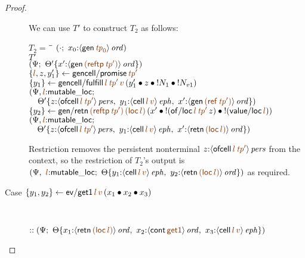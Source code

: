 \begin{proof}
\begin{description}
We can use $T'$ to construct $T_2$ as follows:
\begin{tabbing}
$T_2 = ~$ \= \qquad \= 
    $(\cdot; ~x_0{:}\istrue{\susp{{\sf gen}\,\lf{{\it tp}_0}}})$
\\
\>$T'$
\\
\>\>$(\Psi; ~
     \tackon{\Theta'}
     {x'{:}\istrue{\susp{{\sf gen}\,\lf{({\sf reftp}\,{\it tp}')}}}})$
\\
\>$\trstep{\lf{l}, z, y_1'}{{\sf gencell/promise}\,\lf{{\it tp}'}}$
\\
\>$\trstep{y_1}{{\sf gencell/fulfill}\,\lf{l}\,\lf{{\it tp}'}\,\lf{v}\,
      (\tfuser{y_1'}{\tfuser{z}{\tfuser{\tbangr{N_1}}{\tbangr{N_{v1}}}}})}$
\\
\>\>$(\Psi, \lf{l}{:}{\sf mutable\_loc};$
\\
\>\>$\quad 
     \tackon{\Theta'}
     {z{:}\ispers{\susp{{\sf ofcell}\,\lf{l}\,\lf{{\it tp}'}}}, ~
      y_1{:}\iseph{\susp{{\sf cell}\,\lf{l}\,\lf{v}}}, ~
      x'{:}\istrue{\susp{{\sf gen}\,\lf{({\sf ref}\,{\it tp}')}}}})$
\\
\>$\trstep{y_2}
     {{\sf gen/retn}\,\lf{({\sf reftp}\,{\it tp}')}\,\lf{({\sf loc}\,l)}\,(\tfuser{x'}{\tfuser{\tbangr{({\sf of/loc}\,\lf{l}\,\lf{{\it tp}'}\,z)}}{\tbangr{({\sf value/loc}\,\lf{l})}}})}$
\\
\>\>$(\Psi, \lf{l}{:}{\sf mutable\_loc};$
\\
\>\>$\quad 
     \tackon{\Theta'}
     {z{:}\ispers{\susp{{\sf ofcell}\,\lf{l}\,\lf{{\it tp}'}}}, ~
      y_1{:}\iseph{\susp{{\sf cell}\,\lf{l}\,\lf{v}}}, ~
      x'{:}\istrue{\susp{{\sf retn}\,\lf{({\sf loc}\,l)}}}})$
\end{tabbing}

Restriction removes the persistent nonterminal $z{:}\ispers{\susp{{\sf
      ofcell}\,\lf{l}\,\lf{{\it tp}'}}}$ from the context, so the
restriction of $T_2$'s output is $\left(\Psi, ~ \lf{l}{:}{\sf mutable\_loc}; ~
   \tackon{\Theta}{y_1{:}\iseph{\susp{{\sf cell}\,\lf{l}\,\lf{v}}}, ~
                   y_2{:}\istrue{\susp{{\sf retn}\,\lf{({\sf loc}\,\lf{l})}}}}
   \right)$ as
required.

\medskip

\item
  [Case $\trstep{y_1, y_2}
         {{\sf ev/get1}\,\lf{l}\,\lf{v}\,(\tfuser{x_1}{\tfuser{x_2}{x_3}})}$]~

\qquad 
  $:: \left(\Psi; ~
   \tackon{\Theta}
    {x_1{:}\istrue{\susp{{\sf retn}\,\lf{({\sf loc}\,l)}}}, ~
     x_2{:}\istrue{\susp{{\sf cont}\,\lf{{\sf get1}}}}, ~
     x_3{:}\iseph{\susp{{\sf cell}\,\lf{l}\,\lf{v}}}
    }\right)$


\end{description}
\end{proof}
